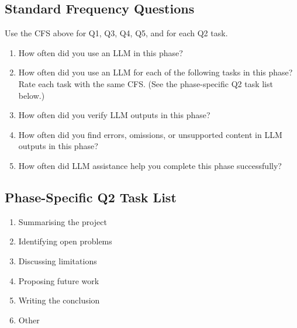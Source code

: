 \subsection*{Standard Frequency Questions}
Use the CFS above for Q1, Q3, Q4, Q5, and for each Q2 task.
\begin{enumerate}
  \item[Q1.] How often did you use an LLM in this phase?
  \item[Q2.] How often did you use an LLM for each of the following tasks in this phase? Rate each task with the same CFS. (See the phase-specific Q2 task list below.)
  \item[Q3.] How often did you verify LLM outputs in this phase?
  \item[Q4.] How often did you find errors, omissions, or unsupported content in LLM outputs in this phase?
  \item[Q5.] How often did LLM assistance help you complete this phase successfully?
\end{enumerate}

\subsection*{Phase-Specific Q2 Task List}
\begin{enumerate}
  \item[a.] Summarising the project
  \item[b.] Identifying open problems
  \item[c.] Discussing limitations
  \item[d.] Proposing future work
  \item[e.] Writing the conclusion
  \item[f.] Other
\end{enumerate}
